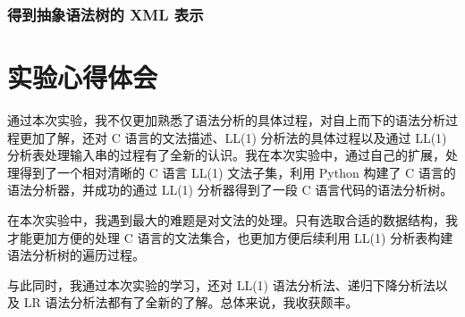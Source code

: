 \documentclass[UTF8]{ctexart}
\begin{document}
\subsubsection{得到抽象语法树的 XML 表示}

\section{实验心得体会}
通过本次实验，我不仅更加熟悉了语法分析的具体过程，对自上而下的语法分析过程更加了解，还对 C 语言的文法描述、LL(1) 分析法的具体过程以及通过 LL(1) 分析表处理输入串的过程有了全新的认识。我在本次实验中，通过自己的扩展，处理得到了一个相对清晰的 C 语言 LL(1) 文法子集，利用 Python 构建了 C 语言的语法分析器，并成功的通过 LL(1) 分析器得到了一段 C 语言代码的语法分析树。

在本次实验中，我遇到最大的难题是对文法的处理。只有选取合适的数据结构，我才能更加方便的处理 C 语言的文法集合，也更加方便后续利用 LL(1) 分析表构建语法分析树的遍历过程。

与此同时，我通过本次实验的学习，还对 LL(1) 语法分析法、递归下降分析法以及 LR 语法分析法都有了全新的了解。总体来说，我收获颇丰。
\end{document}
